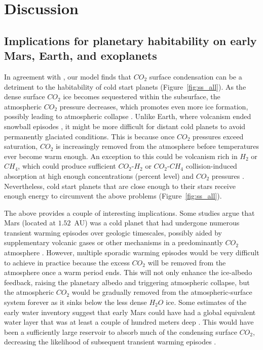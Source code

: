 \documentclass[fleqn,usenatbib]{mnras}
\begin{document}
\section{Discussion}

\subsection{Implications for planetary habitability on early Mars, Earth, and exoplanets}

In agreement with \citet{Turbet2017}, our model finds that $CO_{\mathrm{2}}$ surface condensation can be a detriment to the habitability of cold start planets (Figure~\ref{fig:ss_all}). As the dense surface $CO_{\mathrm{2}}$ ice becomes sequestered within the subsurface, the atmospheric $CO_{\mathrm{2}}$ pressure decreases, which promotes even more ice formation, possibly leading to atmospheric collapse \citep{Turbet2017}. Unlike Earth, where volcanism ended snowball episodes \citep{Hoffman1342}, it might be more difficult for distant cold planets to avoid permanently glaciated conditions. This is because once $CO_{\mathrm{2}}$ pressures exceed saturation, $CO_{\mathrm{2}}$ is increasingly removed from the atmosphere before temperatures ever become warm enough. An exception to this could be volcanism rich in $H_{\mathrm{2}}$ or $CH_{\mathrm{4}}$, which could produce sufficient $CO_{\mathrm{2}}$-$H_{\mathrm{2}}$ or $CO_{\mathrm{2}}$-$CH_{\mathrm{4}}$ collision-induced absorption at high enough concentrations (percent level) and $CO_{\mathrm{2}}$ pressures \citep{ramirez2014,wordsworth_transient_2017,ramirez2017,ramirezkalt2018,turbet_far_2019}. Nevertheless, cold start planets that are close enough to their stars receive enough energy to circumvent the above problems (Figure~\ref{fig:ss_all}). 

The above provides a couple of interesting implications. Some studies argue that Mars (located at $1.52$~AU) was a cold planet that had undergone numerous transient warming episodes over geologic timescales, possibly aided by supplementary volcanic gases or other mechanisms in a predominantly $CO_{\mathrm{2}}$ atmosphere \citep{wordsworth2013,batalha2016,wordsworth_transient_2017,kite_methane_2020,hayworth_warming_2020}. However, multiple sporadic warming episodes would be very difficult to achieve in practice because the excess $CO_{\mathrm{2}}$ will be removed from the atmosphere once a warm period ends. This will not only enhance the ice-albedo feedback, raising the planetary albedo and triggering atmospheric collapse, but the atmospheric $CO_{\mathrm{2}}$ would be gradually removed from the atmospheric-surface system forever as it sinks below the less dense $H_{\mathrm{2}}O$ ice. Some estimates of the early water inventory suggest that early Mars could have had a global equivalent water layer that was at least a couple of hundred meters deep \citep{villanueva2015,ramirezetal2020}.  This would have been a sufficiently large reservoir to absorb much of the condensing surface $CO_{\mathrm{2}}$, decreasing the likelihood of subsequent transient warming episodes \citep{Turbet2017}. 
\end{document}
